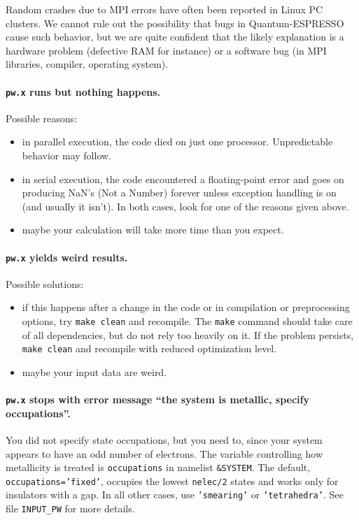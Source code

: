 \documentclass[12pt,a4paper]{article}
\begin{document}
Random crashes due to MPI errors have often been reported in Linux PC 
clusters. We cannot rule out the possibility that bugs in Quantum-ESPRESSO
cause such behavior, but we are quite confident that the likely explanation
is a hardware problem (defective RAM for instance) or a software bug (in MPI 
libraries, compiler, operating system).

\paragraph{\texttt{pw.x} runs but nothing happens.}

Possible reasons:
\begin{itemize}
  \item
    in parallel execution, the code died on just one processor.
    Unpredictable behavior may follow.
  \item
    in serial execution, the code encountered a floating-point error
    and goes on producing NaN's (Not a Number) forever unless
    exception handling is on (and usually it isn't).
    In both cases, look for one of the reasons given above.
  \item
    maybe your calculation will take more time than you expect.
\end{itemize}

\paragraph{\texttt{pw.x} yields weird results.}

Possible solutions:
\begin{itemize}
  \item
    if this happens after a change in the code or in compilation or
    preprocessing options, try \texttt{make clean} and recompile.
    The \texttt{make} command should take care of all dependencies,
    but do not rely too heavily on it. 
    If the problem persists, \texttt{make clean} and recompile with
    reduced optimization level.
  \item
    maybe your input data are weird.
\end{itemize}

\paragraph{\texttt{pw.x} stops with error message ``the system is
           metallic, specify occupations''.}

You did not specify state occupations, but you need to, since your
system appears to have an odd number of electrons.
The variable controlling how metallicity is treated is
\texttt{occupations} in namelist \texttt{\&SYSTEM}.
The default, \texttt{occupations='fixed'}, occupies the lowest
\texttt{nelec/2} states and works only for insulators with a gap.
In all other cases, use \texttt{'smearing'} or \texttt{'tetrahedra'}.
See file \texttt{INPUT\_PW} for more details.
\end{document}
